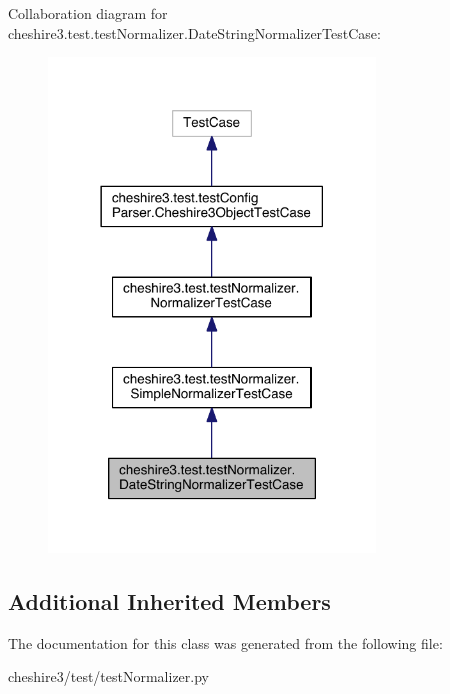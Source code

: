 Collaboration diagram for cheshire3.\-test.\-test\-Normalizer.\-Date\-String\-Normalizer\-Test\-Case\-:
\nopagebreak
\begin{figure}[H]
\begin{center}
\leavevmode
\includegraphics[width=246pt]{classcheshire3_1_1test_1_1test_normalizer_1_1_date_string_normalizer_test_case__coll__graph}
\end{center}
\end{figure}
\subsection*{Additional Inherited Members}


The documentation for this class was generated from the following file\-:\begin{DoxyCompactItemize}
\item 
cheshire3/test/test\-Normalizer.\-py\end{DoxyCompactItemize}
